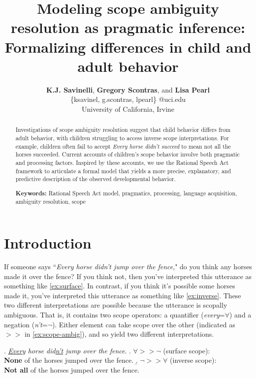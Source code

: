 \documentclass[10pt,a4paper]{article}
\title{Modeling scope ambiguity resolution as pragmatic inference:\\ 
Formalizing differences in child and adult behavior}
\author{\large \textbf{K.J. Savinelli}, \textbf{Gregory Scontras}, and \textbf{Lisa Pearl}\\
\{ksavinel, g.scontras, lpearl\} @uci.edu\\
University of California, Irvine}
\begin{document}
\maketitle

\begin{abstract}
Investigations of scope ambiguity resolution suggest that child behavior differs from adult behavior, with children struggling to access inverse scope interpretations. For example, children often fail to accept \textit{Every horse didn't succeed} to mean not all the horses succeeded. Current accounts of children's scope behavior involve both pragmatic and processing factors.
Inspired by these accounts, we use the Rational Speech Act framework to articulate a formal model that yields a more precise, explanatory, and predictive description of the observed developmental behavior.


\textbf{Keywords:} 
Rational Speech Act model, pragmatics, processing, language acquisition, ambiguity resolution, scope

\end{abstract}

\section{Introduction}

If someone says ``\textit{Every horse didn't jump over the fence}," do you think any horses made it over the fence? If you think not, then you've interpreted this utterance as something like  
\ref{ex:surface}.
In contrast, if you think it's possible some horses made it, you've interpreted this utterance as something like 
\ref{ex:inverse}.
These two different interpretations are possible because the utterance is  scopally ambiguous. That is, it contains two scope operators: a quantifier (\textit{every}=$\forall$) and a negation (\textit{n't}=$\neg$).  Either element can take scope over the other (indicated as $>>$ in \ref{ex:scope-ambig}), and so yield two different interpretations. 

\ex. \label{ex:scope-ambig} \textit{\underline{Every} horse did\underline{n't} jump over the fence}.
\a.  \label{ex:surface} $\forall>>\neg$ (surface scope): \\
\textbf{None} of the horses jumped over the fence.
\b.  \label{ex:inverse} $\neg>>\forall$ (inverse scope):\\ 
\textbf{Not all} of the horses jumped over the fence.
\end{document}
